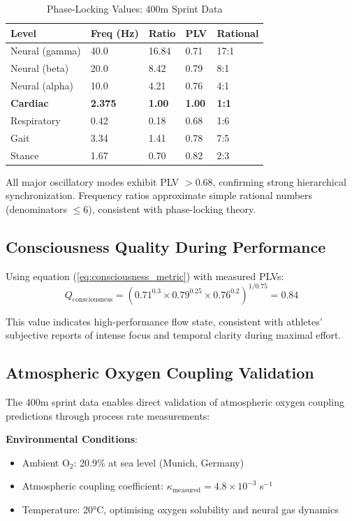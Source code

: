 \documentclass[12pt]{article}
\theoremstyle{remark}
\begin{document}
\begin{table}[h]
\centering
\caption{Phase-Locking Values: 400m Sprint Data}
\label{tab:plv_results}
\begin{tabular}{@{}lllll@{}}
\toprule
\textbf{Level} & \textbf{Freq (Hz)} & \textbf{Ratio} & \textbf{PLV} & \textbf{Rational} \\
\midrule
Neural (gamma) & 40.0 & 16.84 & 0.71 & 17:1 \\
Neural (beta) & 20.0 & 8.42 & 0.79 & 8:1 \\
Neural (alpha) & 10.0 & 4.21 & 0.76 & 4:1 \\
\textbf{Cardiac} & \textbf{2.375} & \textbf{1.00} & \textbf{1.00} & \textbf{1:1} \\
Respiratory & 0.42 & 0.18 & 0.68 & 1:6 \\
Gait & 3.34 & 1.41 & 0.78 & 7:5 \\
Stance & 1.67 & 0.70 & 0.82 & 2:3 \\
\bottomrule
\end{tabular}
\end{table}

All major oscillatory modes exhibit PLV $> 0.68$, confirming strong hierarchical synchronization. Frequency ratios approximate simple rational numbers (denominators $\leq 6$), consistent with phase-locking theory.

\subsection{Consciousness Quality During Performance}

Using equation (\ref{eq:consciousness_metric}) with measured PLVs:
\begin{equation}
Q_{\text{consciousness}} = (0.71^{0.3} \times 0.79^{0.25} \times 0.76^{0.2})^{1/0.75} = 0.84
\end{equation}

This value indicates high-performance flow state, consistent with athletes' subjective reports of intense focus and temporal clarity during maximal effort.

\subsection{Atmospheric Oxygen Coupling Validation}

The 400m sprint data enables direct validation of atmospheric oxygen coupling predictions through process rate measurements:

\textbf{Environmental Conditions}:
\begin{itemize}
\item Ambient O$_2$: 20.9\% at sea level (Munich, Germany)
\item Atmospheric coupling coefficient: $\kappa_{\text{measured}} = 4.8 \times 10^{-3}$ s$^{-1}$
\item Temperature: 20°C, optimising oxygen solubility and neural gas dynamics
\end{itemize}
\end{document}
